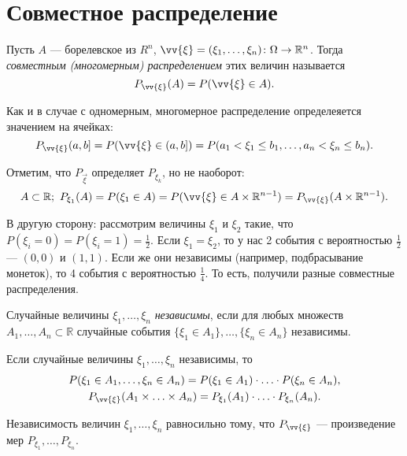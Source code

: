 \section{Совместное распределение}

 \begin{definition}
    Пусть $A$ --- борелевское из $R^n$, 
     $\vv{\xi} = (\xi_1, \ldots, \xi_n) \colon \Omega \rightarrow \mathbb{R}^n$. Тогда \textit{совместным (многомерным) распределением} этих величин называется 
     $$P_{\vv{\xi}}(A) = P(\vv{\xi} \in A).$$
 \end{definition}

Как и в случае с одномерным, многомерное распределение определеяется значением на ячейках:
     $$P_{\vv{\xi}}(a, b] = P(\vv{\xi} \in (a, b]) = P(a_1 < \xi_1 \le b_1, \ldots, a_n < \xi_n \le b_n).$$


     Отметим, что $P_{\overset{\rightarrow}{\xi}}$ определяет $P_{\xi_k}$, но не наоборот:
     $$A\subset\mathbb{R}; \  P_{\xi_1}(A) = P(\xi_1\in A) = P(\vv{\xi}\in A\times\mathbb{R}^{n - 1}) = P_{\vv{\xi}} (A\times\mathbb{R}^{n - 1}).$$


В другую сторону: рассмотрим величины $\xi_1$ и $\xi_2$ такие, что $P(\xi_i = 0) = P(\xi_i = 1) = \frac{1}{2}$.
     Если $\xi_1 = \xi_2$, то у нас 2 события с вероятностью $\frac{1}{2}$ ---  $(0, 0)$ и $(1, 1)$.
     Если же они независимы (например, подбрасывание монеток), то 4 события с вероятностью $\frac{1}{4}$.
     То есть, получили разные совместные распределения.


 \begin{definition}
     Случайные величины $\xi_1, \ldots, \xi_n$ \textit{независимы}, если 
     для любых множеств $A_1, \ldots, A_n \subset \mathbb{R}$ случайные события
     $\{\xi_1\in A_1\}, \ldots, \{\xi_n \in A_n\}$ независимы.
 \end{definition}

\begin{remark}
    Если случайные величины $\xi_1, \ldots, \xi_n$ независимы, то
    \begin{gather*}
        P(\xi_1\in A_1, \ldots, \xi_n\in A_n) = P(\xi_1\in A_1)\cdot\ldots\cdot P(\xi_n\in A_n), \\
        P_{\vv{\xi}}(A_1\times\ldots\times A_n) = P_{\xi_1}(A_1)\cdot\ldots\cdot P_{\xi_n} (A_n).
    \end{gather*}
\end{remark}
    


 \begin{theorem}
     Независимость величин $\xi_1, \ldots, \xi_n$ равносильно тому, что $P_{\vv{\xi}}$ --- произведение мер $P_{\xi_1}, \ldots, P_{\xi_n}$.
 \end{theorem}

